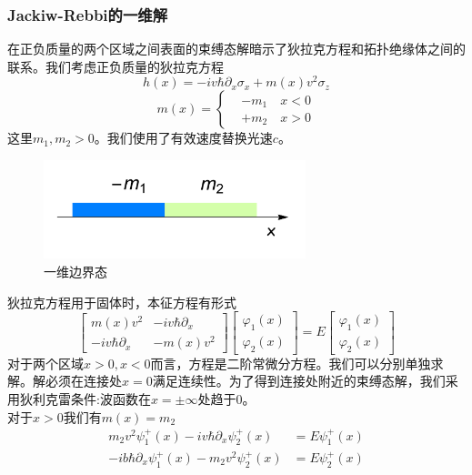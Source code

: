 \documentclass{article}
\numberwithin{equation}{subsection}
\begin{document}
\subsubsection{Jackiw-Rebbi的一维解}
在正负质量的两个区域之间表面的束缚态解暗示了狄拉克方程和拓扑绝缘体之间的联系。我们考虑正负质量的狄拉克方程
\begin{equation}
    h(x)=-iv\hbar\partial_x\sigma_x+m(x)v^2\sigma_z
\end{equation}
\begin{equation}
    m(x)=\begin{cases}
        &-m_1\quad x<0\\
        &+m_2\quad x>0
    \end{cases}
\end{equation}
这里$m_1,m_2>0$。我们使用了有效速度替换光速$c$。
\begin{figure}[h]
    \centering
    \includegraphics[width=3in]{dirac2.pdf}
    \caption{一维边界态}\label{dirac pic 2}
\end{figure}
狄拉克方程用于固体时，本征方程有形式
\begin{equation}
    \begin{bmatrix}
        m(x)v^2&-iv\hbar\partial_x\\
        -iv\hbar\partial_x&-m(x)v^2
    \end{bmatrix}\begin{bmatrix}
        \varphi_1(x)\\\varphi_2(x)
    \end{bmatrix}=E\begin{bmatrix}
        \varphi_1(x)\\\varphi_2(x)
    \end{bmatrix}
\end{equation}
对于两个区域$x>0,x<0$而言，方程是二阶常微分方程。我们可以分别单独求解。解必须在连接处$x=0$满足连续性。为了得到连接处附近的束缚态解，我们采用狄利克雷条件:波函数在$x=\pm\infty$处趋于$0$。\\
对于$x>0$我们有$m(x)=m_2$
\begin{equation}
    \begin{split}
        m_2v^2\psi_1^+(x)-iv\hbar\partial_x\psi_2^+(x)&=E\psi_1^+(x)\\
        -ib\hbar\partial_x\psi_1^+(x)-m_2v^2\psi_2^+(x)&=E\psi_2^+(x)
    \end{split}
\end{equation}
\end{document}
